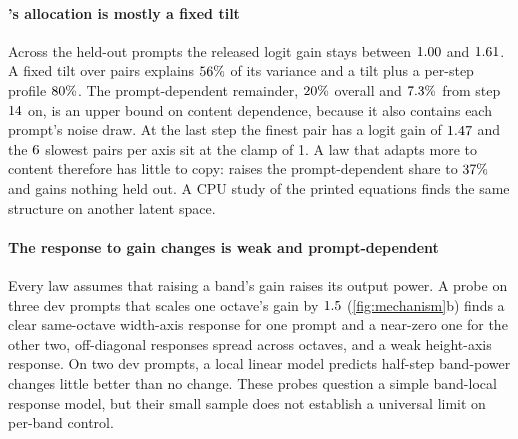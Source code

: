 \paragraph{\sega's allocation is mostly a fixed tilt}
Across the held-out prompts the released logit gain stays between $1.00$ and $1.61$. A fixed tilt over pairs explains $56\%$ of its variance and a tilt plus a per-step profile $80\%$. The prompt-dependent remainder, $20\%$ overall and $7.3\%$ from step $14$ on, is an upper bound on content dependence, because it also contains each prompt's noise draw. At the last step the finest pair has a logit gain of $1.47$ and the $6$ slowest pairs per axis sit at the clamp of 1. A law that adapts more to content therefore has little to copy: \segactm{} raises the prompt-dependent share to $37\%$ and gains nothing held out. A CPU study of the printed equations finds the same structure on another latent space.

\paragraph{The response to gain changes is weak and prompt-dependent}
Every law assumes that raising a band's gain raises its output power. A probe on three dev prompts that scales one octave's gain by $1.5$ (\cref{fig:mechanism}b) finds a clear same-octave width-axis response for one prompt and a near-zero one for the other two, off-diagonal responses spread across octaves, and a weak height-axis response. On two dev prompts, a local linear model predicts half-step band-power changes little better than no change. These probes question a simple band-local response model, but their small sample does not establish a universal limit on per-band control.

